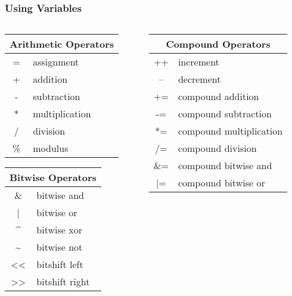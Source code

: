 \begin{frame}
	\frametitle{Using Variables}
	\begin{columns}[c]
		\begin{column}{0.5\textwidth}
			\begin{center}
				\begin{tabular}{c|l}
					\multicolumn{2}{c}{Arithmetic Operators}\\
					\hline
					= & assignment\\
					+ & addition\\
					- & subtraction\\
					* & multiplication\\
					/ & division\\
					\% & modulus\\
				\end{tabular}
				\vfill
				\begin{tabular}{c|l}
					\multicolumn{2}{c}{Bitwise Operators}\\
					\hline
					\& & bitwise and\\
					| & bitwise or\\
					\^{} & bitwise xor\\
					\~{} & bitwise not\\
					<< & bitshift left\\
					>> & bitshift right\\
				\end{tabular}
			\end{center}
		\end{column}
		\begin{column}{0.5\textwidth}
			\begin{center}
				\begin{tabular}{c|l}
					\multicolumn{2}{c}{Compound Operators}\\
					\hline
					++ & increment\\
					-- & decrement\\
					+= & compound addition\\
					-= & compound subtraction\\
					*= & compound multiplication\\
					/= & compound division\\
					\&= & compound bitwise and\\
					|= & compound bitwise or\\
				\end{tabular}
			\end{center}
		\end{column}
	\end{columns}
\end{frame}

